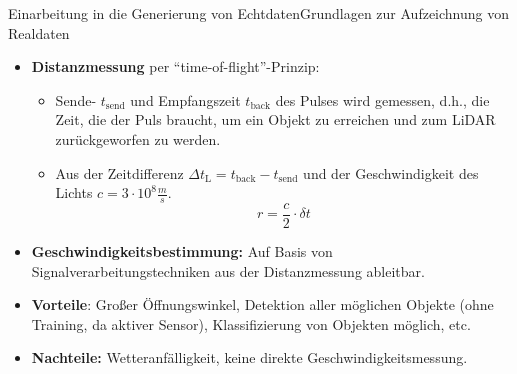 \documentclass[169, handout	]{THIbeamer} %
\begin{document}
	\begin{frame}{Einarbeitung in die Generierung von Echtdaten}{Grundlagen zur Aufzeichnung von Realdaten}
		\begin{itemize}
			\item \textbf{Distanzmessung} per \enquote{time-of-flight}-Prinzip:
			\begin{itemize}
				\item Sende- $t_\text{send}$ und Empfangszeit $t_\text{back}$ des Pulses wird gemessen, d.h., die Zeit, die der Puls braucht, um ein Objekt zu erreichen und zum LiDAR zurückgeworfen zu werden.
				\item Aus der Zeitdifferenz $\Delta t_\text{L}=t_\text{back}-t_\text{send}$ und der Geschwindigkeit des Lichts $ c = 3 \cdot 10^{8} \frac{m}{s} $.
				\begin{equation}
					r = \frac{c}{2} \cdot \delta t
				\end{equation}
			\end{itemize}
			\item \textbf{Geschwindigkeitsbestimmung:} Auf Basis von Signalverarbeitungstechniken aus der Distanzmessung ableitbar.
			\item \textbf{Vorteile}: Großer Öffnungswinkel, Detektion aller möglichen Objekte (ohne Training, da aktiver Sensor), Klassifizierung von Objekten möglich, etc.
			\item \textbf{Nachteile:} Wetteranfälligkeit, keine direkte Geschwindigkeitsmessung.
		\end{itemize}
	\end{frame}
\end{document}
